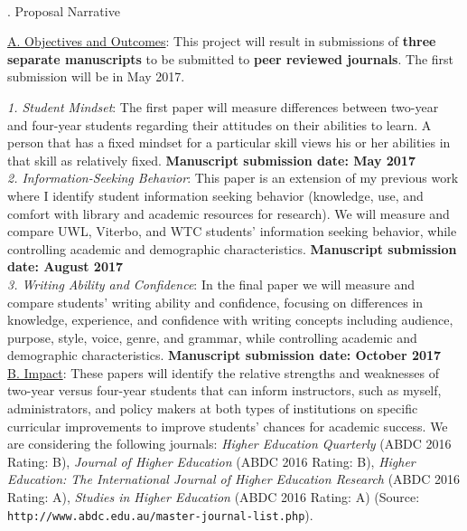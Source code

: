 \documentclass[11pt]{article}
\begin{document}
\ \vspace*{-2.5pc}

. Proposal Narrative

\noindent \underline{A. Objectives and Outcomes}: This project will result in submissions of \textbf{three separate manuscripts} to be submitted to \textbf{peer reviewed journals}.  The first submission will be in May 2017.

\noindent \textit{1. Student Mindset}: The first paper will measure differences between two-year and four-year students regarding their attitudes on their abilities to learn.  A person that has a fixed mindset for a particular skill views his or her abilities in that skill as relatively fixed.  \textbf{Manuscript submission date: May 2017} \\

\noindent \textit{2. Information-Seeking Behavior}: This paper is an extension of my previous work where I identify student information seeking behavior (knowledge, use, and comfort with library and academic resources for research).  We will measure and compare UWL, Viterbo, and WTC students' information seeking behavior, while controlling academic and demographic characteristics. \textbf{Manuscript submission date: August 2017} \\

\noindent \textit{3. Writing Ability and Confidence}: In the final paper we will measure and compare students' writing ability and confidence, focusing on differences in knowledge, experience, and confidence with writing concepts including audience, purpose, style, voice, genre, and grammar, while controlling academic and demographic characteristics.  \textbf{Manuscript submission date: October 2017} \\

\noindent \underline{B. Impact}: These papers will identify the relative strengths and weaknesses of two-year versus four-year students that can inform instructors, such as myself, administrators, and policy makers at both types of institutions on specific curricular improvements to improve students' chances for academic success.  We are considering the following journals: \textit{Higher Education Quarterly} (ABDC 2016 Rating: B), \textit{Journal of Higher Education} (ABDC 2016 Rating: B), \textit{Higher Education: The International Journal of Higher Education Research} (ABDC 2016 Rating: A), \textit{Studies in Higher Education} (ABDC 2016 Rating: A) (Source: \texttt{http://www.abdc.edu.au/master-journal-list.php}). \\
\end{document}

